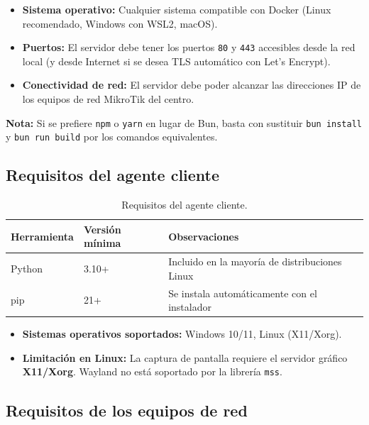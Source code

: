 \documentclass[12pt,a4paper]{article}
\begin{document}
\begin{itemize}
    \item \textbf{Sistema operativo:} Cualquier sistema compatible con Docker (Linux recomendado, Windows con WSL2, macOS).
    \item \textbf{Puertos:} El servidor debe tener los puertos \texttt{80} y \texttt{443} accesibles desde la red local (y desde Internet si se desea TLS automático con Let's Encrypt).
    \item \textbf{Conectividad de red:} El servidor debe poder alcanzar las direcciones IP de los equipos de red MikroTik del centro.
\end{itemize}

\textbf{Nota:} Si se prefiere \texttt{npm} o \texttt{yarn} en lugar de Bun, basta con sustituir \texttt{bun install} y \texttt{bun run build} por los comandos equivalentes.

\subsection{Requisitos del agente cliente}

\begin{table}[H]
\centering
\begin{tabularx}{\textwidth}{lll}
    \toprule
    \textbf{Herramienta} & \textbf{Versión mínima} & \textbf{Observaciones} \\
    \midrule
    Python   & 3.10+  & Incluido en la mayoría de distribuciones Linux \\
    pip      & 21+    & Se instala automáticamente con el instalador \\
    \bottomrule
\end{tabularx}
\caption{Requisitos del agente cliente.}
\end{table}

\begin{itemize}
    \item \textbf{Sistemas operativos soportados:} Windows 10/11, Linux (X11/Xorg).
    \item \textbf{Limitación en Linux:} La captura de pantalla requiere el servidor gráfico \textbf{X11/Xorg}. Wayland no está soportado por la librería \texttt{mss}.
\end{itemize}

\subsection{Requisitos de los equipos de red}
\end{document}
